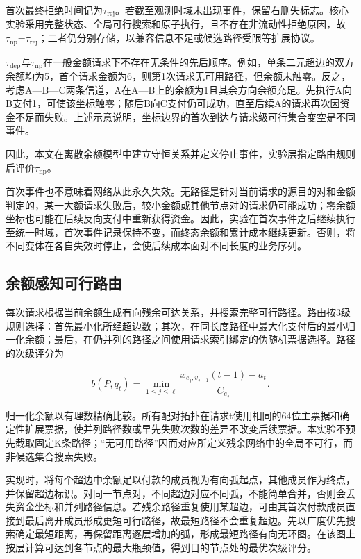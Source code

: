 \documentclass[UTF8,a4paper,twocolumn,fontset=none,zihao=5]{ctexart}
\begin{document}
首次最终拒绝时间记为$\tau_{\mathrm{rej}}$。若截至观测时域未出现事件，保留右删失标志。核心实验采用完整状态、全局可行搜索和原子执行，且不存在非流动性拒绝原因，故$\tau_{\mathrm{np}}$=$\tau_{\mathrm{rej}}$；二者仍分别存储，以兼容信息不足或候选路径受限等扩展协议。


$\tau_{\mathrm{dep}}$与$\tau_{\mathrm{np}}$在一般金额请求下不存在无条件的先后顺序。例如，单条二元超边的双方余额均为5，首个请求金额为6，则第1次请求无可用路径，但余额未触零。反之，考虑A—B—C两条信道，A在A—B上的余额为1且其余方向余额充足。先执行A向B支付1，可使该坐标触零；随后B向C支付仍可成功，直至后续A的请求再次因资金不足而失败。上述示意说明，坐标边界的首次到达与请求级可行集合变空是不同事件。


因此，本文在离散余额模型中建立守恒关系并定义停止事件，实验层指定路由规则后评价$\tau_{\mathrm{np}}$。


首次事件也不意味着网络从此永久失效。无路径是针对当前请求的源目的对和金额判定的，某一大额请求失败后，较小金额或其他节点对的请求仍可能成功；零余额坐标也可能在后续反向支付中重新获得资金。因此，实验在首次事件之后继续执行至统一时域，首次事件记录保持不变，而终态余额和累计成本继续更新。否则，将不同变体在各自失效时停止，会使后续成本面对不同长度的业务序列。




\subsection{余额感知可行路由}

每次请求根据当前余额生成有向残余可达关系，并搜索完整可行路径。路由按3级规则选择：首先最小化所经超边数；其次，在同长度路径中最大化支付后的最小归一化余额；最后，在仍并列的路径之间使用请求索引绑定的伪随机票据选择。路径的次级评分为



\begin{equation}
b(P,q_t)=\min_{1\leq j\leq\ell}\frac{x_{e_j,v_{j-1}}(t-1)-a_t}{C_{e_j}}.
\label{eq:6}\end{equation}


归一化余额以有理数精确比较。所有配对拓扑在请求t使用相同的64位主票据和确定性扩展票据，使并列路径数或早先失败次数的差异不改变后续票据。本实验不预先截取固定K条路径；“无可用路径”因而对应所定义残余网络中的全局不可行，而非候选集合搜索失败。


实现时，将每个超边中余额足以付款的成员视为有向弧起点，其他成员作为终点，并保留超边标识。对同一节点对，不同超边对应不同弧，不能简单合并，否则会丢失资金坐标和并列路径信息。若残余路径重复使用某超边，可由其首次付款成员直接到最后离开成员形成更短可行路径，故最短路径不会重复超边。先以广度优先搜索确定最短距离，再保留距离逐层增加的弧，形成最短路径有向无环图。在该图上按层计算可达到各节点的最大瓶颈值，得到目的节点处的最优次级评分。
\end{document}
